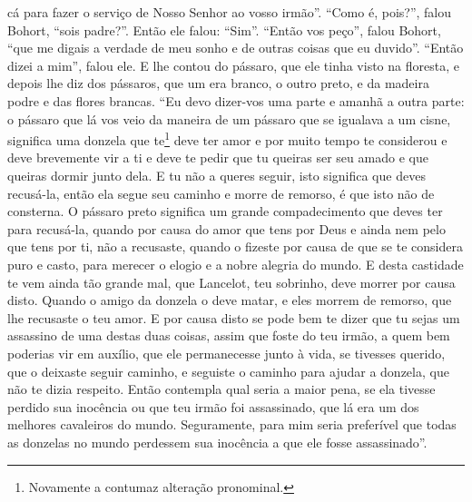 cá para fazer o serviço de Nosso Senhor ao vosso irmão”. “Como é, pois?”, falou
Bohort, “sois padre?”. Então ele falou: “Sim”. “Então vos peço”, falou Bohort,
“que me digais a verdade de meu sonho e de outras coisas que eu duvido”. “Então
dizei a mim”, falou ele. E lhe contou do pássaro, que ele tinha visto na
floresta, e depois lhe diz dos pássaros, que um era branco, o outro preto, e da
madeira podre e das flores brancas. “Eu devo dizer-vos uma parte e amanhã a
outra parte: o pássaro que lá vos veio da maneira de um pássaro que se igualava
a um cisne, significa uma donzela que te\footnote{ Novamente a contumaz
alteração pronominal. } deve ter amor e por muito tempo te
considerou e deve brevemente vir a ti e deve te pedir que tu queiras ser seu
amado e que queiras dormir junto dela. E tu não a queres seguir, isto significa
que deves recusá-la, então ela segue seu caminho e morre de remorso, é que isto
não de consterna. O pássaro preto significa um grande compadecimento que deves
ter para recusá-la, quando por causa do amor que tens por Deus e ainda nem pelo
que tens por ti, não a recusaste, quando o fizeste por causa de que se te
considera puro e casto, para merecer o elogio e a nobre alegria do mundo. E
desta castidade te vem ainda tão grande mal, que Lancelot, teu sobrinho, deve
morrer por causa disto. Quando o amigo da donzela o deve matar, e eles morrem
de remorso, que lhe recusaste o teu amor. E por causa disto se pode bem te
dizer que tu sejas um assassino de uma destas duas coisas, assim que foste do
teu irmão, a quem bem poderias vir em auxílio, que ele permanecesse junto à
vida, se tivesses querido, que o deixaste seguir caminho, e seguiste o caminho
para ajudar a donzela, que não te dizia respeito. Então contempla qual seria a
maior pena, se ela tivesse perdido sua inocência ou que teu irmão foi
assassinado, que lá era um dos melhores cavaleiros do mundo. Seguramente, para
mim seria preferível que todas as donzelas no mundo perdessem sua inocência a
que ele fosse assassinado”. 

